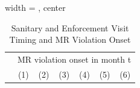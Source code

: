 
\begin{table}[htbp]
   
   \caption{\label{tab:sanitary_visit_mr_violation_iterative} Sanitary and Enforcement Visit Timing and MR Violation Onset}
   \bigskip
   
   \centering
   
   \begin{adjustbox}{width = \textwidth, center}
      
      
      \begin{tabular}{lcccccc}
         \toprule
         
          & \multicolumn{6}{c}{MR violation onset in month t}\\
         
                                               & (1)            & (2)           & (3)           & (4)            & (5)           & (6)\\  
         

\end{tabular}
\end{adjustbox}
\end{table}
